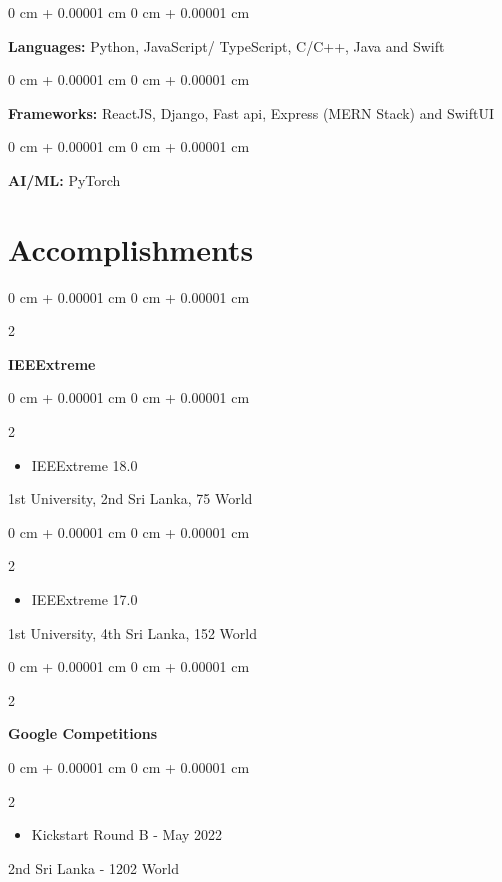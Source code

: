 \documentclass[10pt, letterpaper]{article}
\newenvironment{highlights}{
    \begin{itemize}[
        topsep=0.10 cm,
        parsep=0.10 cm,
        partopsep=0pt,
        itemsep=0pt,
        leftmargin=0 cm + 10pt
    ]
}{
    \end{itemize}
} %
\newenvironment{onecolentry}{
    \begin{adjustwidth}{
        0 cm + 0.00001 cm
    }{
        0 cm + 0.00001 cm
    }
}{
    \end{adjustwidth}
} %
\newenvironment{twocolentry}[2][]{
    \onecolentry
    \def\secondColumn{#2}
    \setcolumnwidth{\fill, 6.5 cm}
    \begin{paracol}{2}
}{
    \switchcolumn \raggedleft \secondColumn
    \end{paracol}
    \endonecolentry
} %
\begin{document}
        
        \begin{onecolentry}
            \textbf{Languages:} Python, JavaScript/ TypeScript, C/C++, Java and Swift
        \end{onecolentry}

        \vspace{0.2 cm}

        \begin{onecolentry}
            \textbf{Frameworks:} ReactJS, Django, Fast api, Express (MERN Stack) and SwiftUI
        \end{onecolentry}

        \vspace{0.2 cm}
        
        \begin{onecolentry}
            \textbf{AI/ML:} PyTorch
        \end{onecolentry}



    \section{Accomplishments}

    \begin{twocolentry}{
        }
    \textbf{IEEExtreme}
\end{twocolentry}

\vspace{0.10 cm}
\begin{twocolentry} {
    1st University, 2nd Sri Lanka, 75 World
}
    \begin{highlights}
        \item IEEExtreme 18.0
    \end{highlights}
\end{twocolentry}

\begin{twocolentry} {
    1st University, 4th Sri Lanka, 152 World
}
    \begin{highlights}
        \item IEEExtreme 17.0
    \end{highlights}
\end{twocolentry}

\vspace{0.20 cm}
\begin{twocolentry}{
        }
    \textbf{Google Competitions}
\end{twocolentry}

\vspace{0.10 cm}
\begin{twocolentry} {
    2nd Sri Lanka - 1202 World
}
    \begin{highlights}
        \item Kickstart Round B - May 2022
    \end{highlights}
\end{twocolentry}
\end{document}

